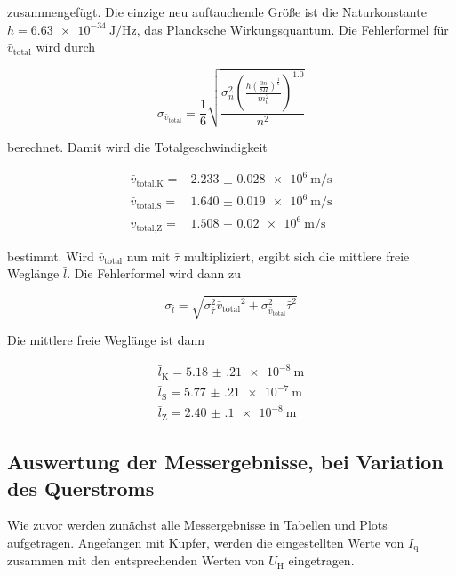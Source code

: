 zusammengefügt.
Die einzige neu auftauchende Größe ist die Naturkonstante $h = \SI{6.63e-34}{\joule\per\hertz}$, das Plancksche Wirkungsquantum.\cite{physics_constants}
Die Fehlerformel für $\bar{v}_\text{total}$ wird durch 

\begin{equation}
    \sigma _{\bar{v}_\text{total}} = \frac{1}{6}  \sqrt{\frac{\sigma_{n}^{2} \left(\frac{h \left(\frac{3 n}{8 \Pi}\right)^{\frac{1}{6}}}{m_{0}^{2}}\right)^{1.0}}{n^{2}}}
    \label{eq:totalgeschw._fehler}
\end{equation}

berechnet.
Damit wird die Totalgeschwindigkeit

\begin{align}
    \bar{v}_\text{total,K} =& \SI{2.233(28)e6}{\meter\per\second}\\
    \bar{v}_\text{total,S} =& \SI{1.640(19)e6}{\meter\per\second}\\
    \bar{v}_\text{total,Z} =& \SI{1.508(20)e6}{\meter\per\second}
    \label{eq:vtotal1}
\end{align}

bestimmt.
Wird $\bar{v}_\text{total}$ nun mit $\bar{\tau}$ multipliziert, ergibt sich die mittlere freie Weglänge $\bar{l}$.
Die Fehlerformel wird dann zu

\begin{equation}
    \sigma _{\bar{l}} = \sqrt{\sigma_{\bar{\tau}}^{2} {\bar{v}_\text{total}}^{2} + \sigma_{\bar{v}_\text{total}}^{2} {\bar{\tau}}^{2}}
    \label{eq:weglaenge_fehler}
\end{equation}

Die mittlere freie Weglänge ist dann

\begin{align}
    \bar{l}_\text{K} = \SI{5.18(21)e-8}{\meter}\\
    \bar{l}_\text{S} = \SI{5.77(21)e-7}{\meter}\\
    \bar{l}_\text{Z} = \SI{2.40(10)e-8}{\meter}
    \label{eq:weglaenge1}
\end{align}

\subsection{Auswertung der Messergebnisse, bei Variation des Querstroms}
\label{ssec:mess2}

Wie zuvor werden zunächst alle Messergebnisse in Tabellen und Plots aufgetragen.
Angefangen mit Kupfer, werden die eingestellten Werte von $I_\text{q}$ zusammen mit den entsprechenden Werten von $U_\text{H}$ eingetragen.


